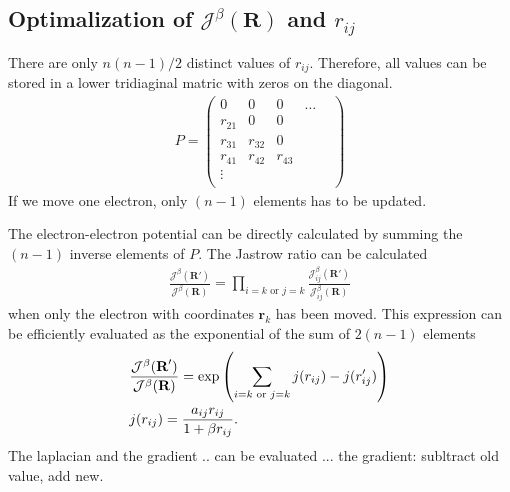 \documentclass[a4paper,10pt,twocolumn]{article} %
\newcommand{\ts}[1]{\textbf{#1}}
\begin{document}
\subsection{Optimalization of $\mathcal J^\beta(\ts R)$ and $r_{ij}$}%
There are only $n(n-1)/2$ distinct values of $r_{ij}$. Therefore, all values can be stored in a lower tridiaginal matric with zeros on the diagonal.
\begin{align}
	P = 
\left(
\begin{matrix}
	0 		& 0	 	&0 		&\dots	&\\
	r_{21}  & 0 	&0 		& &\\
	r_{31} 	& r_{32}&0 		& &\\
	r_{41} 	& r_{42}&r_{43} & &\\
	\vdots 	& 		& 		& &\\
\end{matrix}
\right)\label{eqP}
\end{align}
If we move one electron, only $(n-1)$ elements has to be updated. 

The electron-electron potential can be directly calculated by summing the $(n-1)$ inverse elements of $P$. The Jastrow ratio can be calculated
\begin{align}
	\frac{\mathcal J^\beta(\ts R')}{\mathcal J^\beta(\ts R)}
	= \prod_{i=k\text{ or }j=k} \frac{ \mathcal J_{ij}^\beta(\ts R') }{ \mathcal J_{ij}^\beta(\ts R)}
\end{align} 
when only the electron with coordinates $\ts r_k$ has been moved. This expression can be efficiently evaluated as the exponential of the sum of $2(n-1)$ elements
\begin{align}
	&\frac{\mathcal J^\beta(\ts R')}{\mathcal J^\beta(\ts R)}=
	\exp\left(\sum_{i=k\text{ or }j=k}  j(r_{ij})  - j(r'_{ij}) \right)\notag\\
	&j(r_{ij})=\frac {a_{ij}r_{ij}}{1+\beta r_{ij}}.
\end{align}
The laplacian and the gradient $..$ can be evaluated ...
the gradient: subltract old value, add new.
\end{document}
